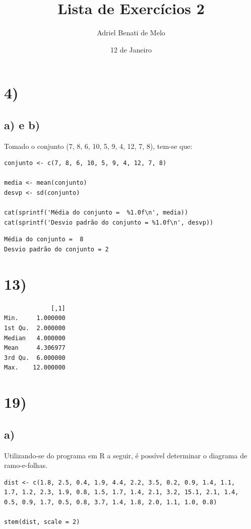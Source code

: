 \documentclass[11pt]{article}
\author{Adriel Benati de Melo}
\date{12 de Janeiro}
\title{Lista de Exercícios 2}
\begin{document}
\maketitle

\section*{4)}
\label{sec:org85f1683}

\subsection*{a) e b)}
\label{sec:org9bd919e}

Tomado o conjunto (7, 8, 6, 10, 5, 9, 4, 12, 7, 8), tem-se que:

\begin{verbatim}
conjunto <- c(7, 8, 6, 10, 5, 9, 4, 12, 7, 8)

media <- mean(conjunto)
desvp <- sd(conjunto)

cat(sprintf('Média do conjunto =  %1.0f\n', media))
cat(sprintf('Desvio padrão do conjunto = %1.0f\n', desvp))
\end{verbatim}

\begin{verbatim}
Média do conjunto =  8
Desvio padrão do conjunto = 2
\end{verbatim}

\section*{13)}
\label{sec:org9e04ff5}

\begin{verbatim}
             [,1]
Min.     1.000000
1st Qu.  2.000000
Median   4.000000
Mean     4.306977
3rd Qu.  6.000000
Max.    12.000000
\end{verbatim}

\section*{19)}
\label{sec:orgec9c189}

\subsection*{a)}
\label{sec:org4723154}

Utilizando-se do programa em R a seguir, é possível determinar o
diagrama de ramo-e-folhas.

\begin{verbatim}
dist <- c(1.8, 2.5, 0.4, 1.9, 4.4, 2.2, 3.5, 0.2, 0.9, 1.4, 1.1,
1.7, 1.2, 2.3, 1.9, 0.8, 1.5, 1.7, 1.4, 2.1, 3.2, 15.1, 2.1, 1.4,
0.5, 0.9, 1.7, 0.5, 0.8, 3.7, 1.4, 1.8, 2.0, 1.1, 1.0, 0.8)

stem(dist, scale = 2)
\end{verbatim}
\end{document}
